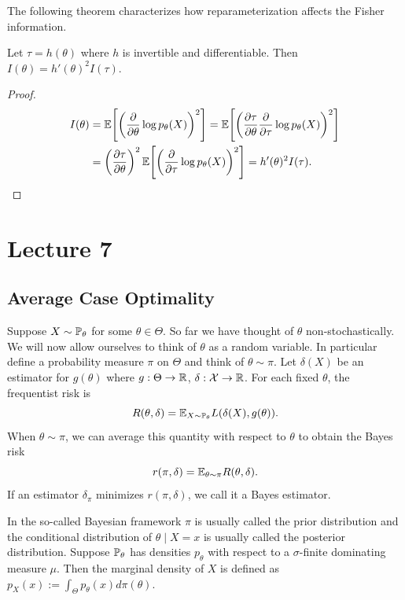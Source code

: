 \noindent The following theorem characterizes how reparameterization affects the Fisher information.
\begin{theorem}
	 Let $\tau = h(\theta)$ where $h$ is invertible and differentiable. Then $I(\theta) = h'(\theta)^2 I(\tau)$.
\end{theorem}

\begin{proof}
	\begin{align*}
	I(\theta)
	&=
	\mathbb{E}\!\left[
	\left(\frac{\partial}{\partial\theta}\log p_\theta(X)\right)^2
	\right] =
	\mathbb{E}\!\left[
	\left(
	\frac{\partial\tau}{\partial\theta}
	\frac{\partial}{\partial\tau}\log p_\theta(X)
	\right)^2
	\right] \\
	&=
	\left(\frac{\partial\tau}{\partial\theta}\right)^2
	\mathbb{E}\!\left[
	\left(\frac{\partial}{\partial\tau}\log p_\theta(X)\right)^2
	\right] =h'(\theta)^2I(\tau).
	\end{align*}
\end{proof}

\newpage
\section{Lecture 7}

\subsection{Average Case Optimality}

Suppose $X \sim \mathbb{P}_\theta$ for some $\theta \in \Theta$. So far we have thought of $\theta$ non-stochastically. We will now allow ourselves to think of $\theta$ as a random variable. In particular define a probability measure $\pi$ on $\Theta$ and think of $\theta \sim \pi$. Let $\delta(X)$ be an estimator for $g(\theta)$ where $g : \Theta \to \mathbb{R}$, $\delta : \mathcal X \to \mathbb{R}$. For each fixed $\theta$, the frequentist risk is 
\[
	R(\theta, \delta) = \mathbb{E}_{X \sim \mathbb{P}_\theta} L(\delta(X), g(\theta)).
\]
When $\theta \sim \pi$, we can average this quantity with respect to $\theta$ to obtain the Bayes risk
\[
	r(\pi, \delta) = \mathbb{E}_{\theta \sim \pi} R(\theta, \delta).
\]
If an estimator $\delta_\pi$ minimizes $r(\pi, \delta)$, we call it a Bayes estimator. 

\medskip \noindent In the so-called Bayesian framework $\pi$ is usually called the prior distribution and the conditional distribution of $\theta \mid X = x$ is usually called the posterior distribution. Suppose $\mathbb{P}_\theta$ has densities $p_\theta$ with respect to a $\sigma$-finite dominating measure $\mu$. Then the marginal density of $X$ is defined as $p_X(x) := \int_{\Theta} p_\theta(x) d\pi(\theta)$.


